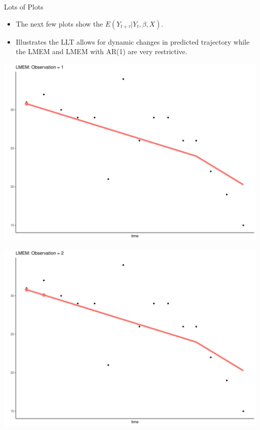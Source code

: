 \documentclass[
  ignorenonframetext,
]{beamer}
\providecommand{\tightlist}{%
  \setlength{\itemsep}{0pt}\setlength{\parskip}{0pt}}
\begin{document}
\begin{frame}{Lots of Plots}
\protect\hypertarget{lots-of-plots}{}
\begin{itemize}
\tightlist
\item
  The next few plots show the \(E(Y_{t+\tau}|Y_t, \beta, X)\).
\item
  Illustrates the LLT allows for dynamic changes in predicted trajectory
  while the LMEM and LMEM with AR(1) are very restrictive.
\end{itemize}
\end{frame}

\begin{frame}{}
\protect\hypertarget{section}{}
\includegraphics{Prez4_files/figure-beamer/unnamed-chunk-13-1.pdf}
\end{frame}

\begin{frame}{}
\protect\hypertarget{section-1}{}
\includegraphics{Prez4_files/figure-beamer/unnamed-chunk-13-2.pdf}
\end{frame}
\end{document}

